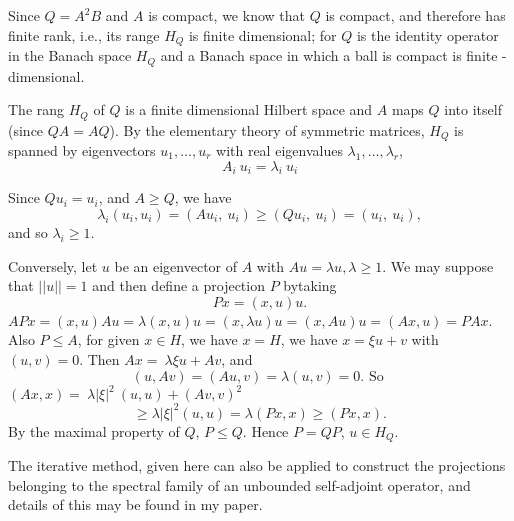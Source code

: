 Since $Q = A^2 B$ and $A$ is compact, we know that $Q$ is compact, and
therefore has finite rank, i.e., its range $H_Q$ is finite  dimensional;
for $Q$ is the identity operator in the Banach space $H_Q$ and a
Banach space in which a ball is compact is finite -dimensional.  

The rang $H_Q$ of $Q$ is a finite dimensional Hilbert space and $A$
maps $Q$ into itself (since $QA = AQ$). By the elementary theory of
symmetric matrices, $H_Q$ is spanned by eigenvectors $u_1, \ldots,u_r$
with real eigenvalues $\lambda_1, \ldots,\lambda_r$, 
$$
A_i ~ u_i = \lambda_i ~ u_i
$$

Since $Qu_i = u_i$, and  $A \ge Q$, we have
$$
\lambda_i (u_i,u_i) = (Au_i , ~ u_i) \ge (Qu_i , ~u_i) = (u_i,~ u_i),
$$
and so  $\lambda_i \ge 1$.

Conversely, let $u$ be an eigenvector of $A$ with $Au = \lambda u,
\lambda \ge 1$. We may suppose that $|| u || = 1$ and then define a
projection $P$ by\pageoriginale taking  
$$
Px = (x,u)u.
$$
$APx = (x,u)Au  = \lambda (x,u)u = (x, \lambda u)u = (x, Au)u = (Ax,u)
= PAx$. Also $P \leq A$, for given  $x \in H$, we have $x = H$, we
have $x = \xi u+v$ with  $(u,v) = 0$. Then $Ax = ~ \lambda \xi u +
Av$, and  
$$
(u, Av) = (Au,v) = \lambda (u,v) = 0. \text{ So }
$$
$(Ax,x) = ~ \lambda | \xi |^2 ~ (u,u) + (Av,v)^2 $
$$
\ge \lambda |\xi|^2 (u,u) = \lambda (Px,x) \ge  (Px,x).
$$
By the maximal property of $Q$, $P \leq Q$. Hence $P = QP$, $u \in H_Q$. 

The iterative method, given here can also be applied to construct the
projections belonging to the spectral family of an unbounded
self-adjoint operator, and details of this may be found in my paper. 
